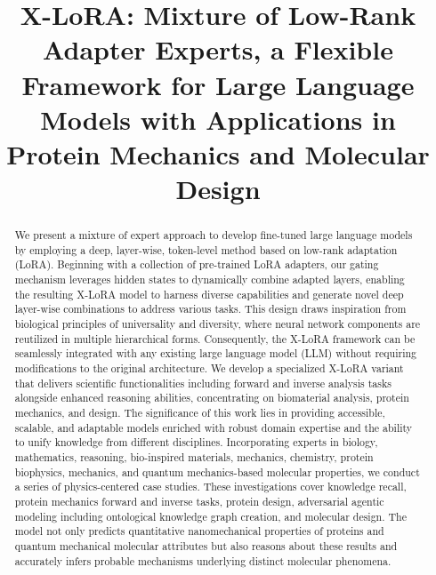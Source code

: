 \title{X-LoRA: Mixture of Low-Rank Adapter Experts, a Flexible Framework for Large Language Models with Applications in Protein Mechanics and Molecular Design}

\begin{abstract}
We present a mixture of expert approach to develop fine-tuned large language models by employing a deep, layer-wise, token-level method based on low-rank adaptation (LoRA). Beginning with a collection of pre-trained LoRA adapters, our gating mechanism leverages hidden states to dynamically combine adapted layers, enabling the resulting X-LoRA model to harness diverse capabilities and generate novel deep layer-wise combinations to address various tasks. This design draws inspiration from biological principles of universality and diversity, where neural network components are reutilized in multiple hierarchical forms. Consequently, the X-LoRA framework can be seamlessly integrated with any existing large language model (LLM) without requiring modifications to the original architecture. We develop a specialized X-LoRA variant that delivers scientific functionalities including forward and inverse analysis tasks alongside enhanced reasoning abilities, concentrating on biomaterial analysis, protein mechanics, and design. The significance of this work lies in providing accessible, scalable, and adaptable models enriched with robust domain expertise and the ability to unify knowledge from different disciplines. Incorporating experts in biology, mathematics, reasoning, bio-inspired materials, mechanics, chemistry, protein biophysics, mechanics, and quantum mechanics-based molecular properties, we conduct a series of physics-centered case studies. These investigations cover knowledge recall, protein mechanics forward and inverse tasks, protein design, adversarial agentic modeling including ontological knowledge graph creation, and molecular design. The model not only predicts quantitative nanomechanical properties of proteins and quantum mechanical molecular attributes but also reasons about these results and accurately infers probable mechanisms underlying distinct molecular phenomena.
\end{abstract}

